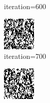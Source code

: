 \documentclass{article}
\begin{document}
\begin{figure}[h]
\begin{subfigure}[t]{0.18\textwidth}
\vspace{-0.6cm}
\caption{iteration=600}
\end{subfigure}\hspace{0.01\textwidth}
\begin{subfigure}[t]{0.18\textwidth}
\centering
\includegraphics[width=\textwidth]{./computational/results/gibbs_comb_sampler_positive_iter_700.png}
\vspace{-0.6cm}
\caption{iteration=700}
\end{subfigure}\hspace{0.01\textwidth}
\begin{subfigure}[t]{0.18\textwidth}
\centering
\includegraphics[width=\textwidth]{./computational/results/gibbs_comb_sampler_positive_iter_800.png}

\end{subfigure}
\end{figure}
\end{document}
